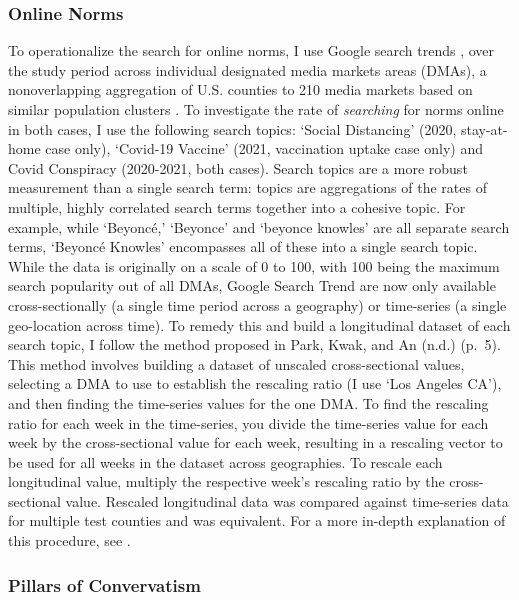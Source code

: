 \hypertarget{online-norms}{%
\subsubsection{Online Norms}\label{online-norms}}

To operationalize the search for online norms, I use Google search trends \citep{googletrends},
over the study period across individual designated media markets areas (DMAs), a
nonoverlapping aggregation of U.S. counties to 210 media markets based on
similar population clusters \citep{dma_key}. To investigate the rate of \emph{searching} for norms
online in both cases, I use the following search topics: `Social Distancing'
(2020, stay-at-home case only), `Covid-19 Vaccine' (2021, vaccination uptake case
only) and Covid Conspiracy (2020-2021, both cases). Search topics are a more
robust measurement than a single search term: topics are aggregations of the
rates of multiple, highly correlated search terms together into a cohesive
topic. For example, while `Beyoncé,' `Beyonce' and `beyonce knowles' are all
separate search terms, `Beyoncé Knowles' encompasses all of these into a single
search topic. While the data is originally on a scale of 0 to 100, with
100 being the maximum search popularity out of all DMAs, Google Search Trend are
now only available cross-sectionally (a single time period across a geography)
or time-series (a single geo-location across time). To remedy this and build a
longitudinal dataset of each search topic, I follow the method proposed in
Park, Kwak, and An (n.d.) (p.~5). This method involves building a dataset of unscaled
cross-sectional values, selecting a DMA to use to establish the rescaling ratio
(I use `Los Angeles CA'), and then finding the time-series values for the one
DMA. To find the rescaling ratio for each week in the time-series, you divide
the time-series value for each week by the cross-sectional value for each week,
resulting in a rescaling vector to be used for all weeks in the dataset across
geographies. To rescale each longitudinal value, multiply the respective week's
rescaling ratio by the cross-sectional value. Rescaled longitudinal data was
compared against time-series data for multiple test counties and was equivalent.
For a more in-depth explanation of this procedure, see \citet[p. 5]{park_etal}.

\hypertarget{pillars-of-convervatism}{%
\subsubsection{Pillars of Convervatism}\label{pillars-of-convervatism}}

